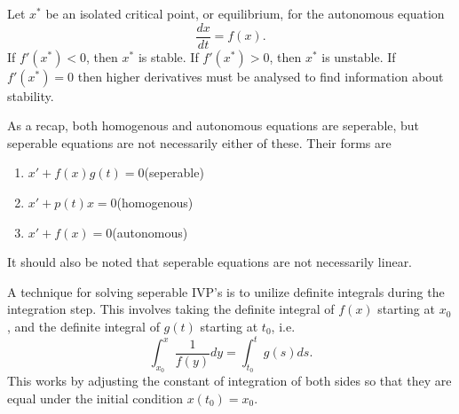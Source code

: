 \documentclass[nobib,notoc]{tufte-handout}
\begin{document}
\begin{thm}
	Let \(x^*\) be an isolated critical point, or equilibrium, for the autonomous equation
	\begin{equation*}
		\frac{dx}{dt}=f(x).
	\end{equation*}
	If \(f'(x^*)<0\), then \(x^*\) is stable. If \(f'(x^*)>0\), then \(x^*\) is unstable. If \(f'(x^*)=0\) then higher derivatives must be analysed to find information about stability.
\end{thm}
\begin{rema}
	As a recap, both homogenous and autonomous equations are seperable, but seperable equations are not necessarily either of these. Their forms are
	\begin{enumerate}
		\item \(x'+f(x)g(t)=0\)\qquad (seperable)
		\item \(x'+p(t)x=0\)\qquad (homogenous)
		\item \(x'+f(x)=0\)\qquad (autonomous)
	\end{enumerate}
	It should also be noted that seperable equations are not necessarily linear.
\end{rema}
\begin{rema}
	A technique for solving seperable IVP's is to unilize definite integrals during the integration step. This involves taking the definite integral of \(f(x)\) starting at \(x_0\), and the definite integral of \(g(t)\) starting at \(t_0\), i.e.
	\begin{equation*}
		\int_{x_0}^x\frac{1}{f(y)}dy=\int_{t_0}^t g(s)ds.
	\end{equation*}
	This works by adjusting the constant of integration of both sides so that they are equal under the initial condition \(x(t_0)=x_0\).
\end{rema}
\end{document}
